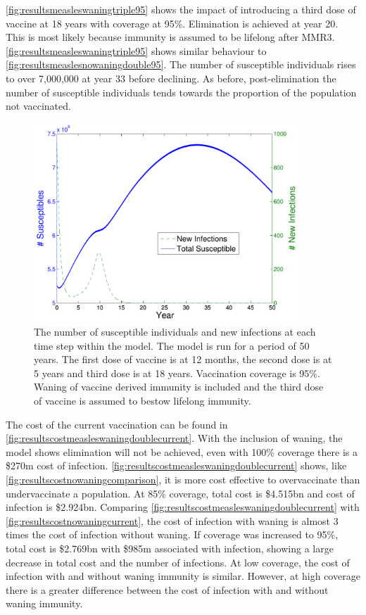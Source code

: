 \documentclass[a4paper,11pt] {scrartcl}
\begin{document}
\autoref{fig:resultsmeasleswaningtriple95} shows the impact of introducing a third dose of vaccine at 18 years with coverage at 95\%. Elimination is achieved at year 20. This is most likely because immunity is assumed to be lifelong after MMR3. \autoref{fig:resultsmeasleswaningtriple95} shows similar behaviour to \autoref{fig:resultsmeaslesnowaningdouble95}. The number of susceptible individuals rises to over 7,000,000 at year 33 before declining. As before, post-elimination the number of susceptible individuals tends towards the proportion of the population not vaccinated.

\begin{figure}[h]
	\centering
	\includegraphics[width=100mm]{measleswaningtriple95}
	\caption{The number of susceptible individuals and new infections at each time step within the model. The model is run for a period of 50 years. The first dose of vaccine is at 12 months, the second dose is at 5 years and third dose is at 18 years. Vaccination coverage is 95\%. Waning of vaccine derived immunity is included and the third dose of vaccine is assumed to bestow lifelong immunity.}
	\label{fig:resultsmeasleswaningtriple95}
\end{figure}

The cost of the current vaccination can be found in \autoref{fig:resultscostmeasleswaningdoublecurrent}. With the inclusion of waning, the model shows elimination will not be achieved, even with 100\% coverage there is a \$270m cost of infection. \autoref{fig:resultscostmeasleswaningdoublecurrent} shows, like \autoref{fig:resultscostnowaningcomparison}, it is more cost effective to overvaccinate than undervaccinate a population. At 85\% coverage, total cost is \$4.515bn and cost of infection is \$2.924bn. Comparing \autoref{fig:resultscostmeasleswaningdoublecurrent} with \autoref{fig:resultscostnowaningcurrent}, the cost of infection with waning is almost 3 times the cost of infection without waning. If coverage was increased to 95\%, total cost is \$2.769bn with \$985m associated with infection, showing a large decrease in total cost and the number of infections. At low coverage, the cost of infection with and without waning immunity is similar. However, at high coverage there is a greater difference between the cost of infection with and without waning immunity.
\end{document}
